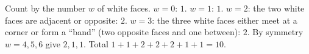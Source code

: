 Count by the number $w$ of white faces. $w=0$: $1$. $w=1$: $1$. $w=2$: the two white faces are adjacent or opposite: $2$. $w=3$: the three white faces either meet at a corner or form a ``band'' (two opposite faces and one between): $2$. By symmetry $w=4,5,6$ give $2,1,1$. Total $1+1+2+2+2+1+1=\boxed{10}$.
